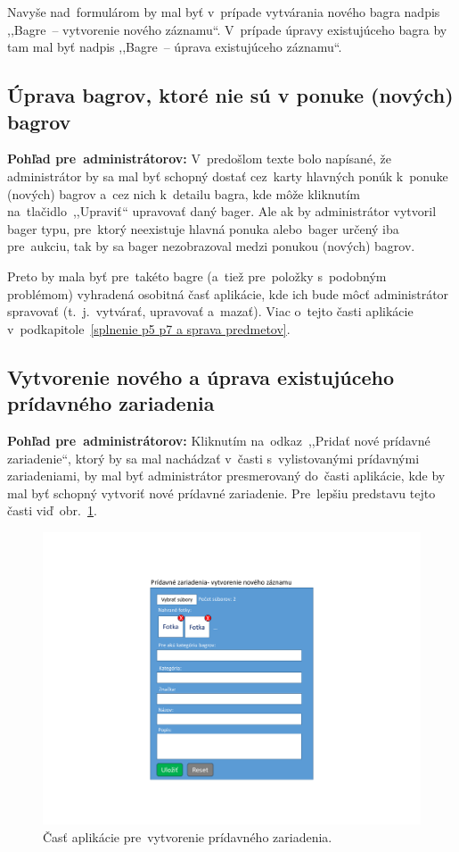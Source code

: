 Navyše nad~formulárom by mal byť v~prípade vytvárania nového bagra nadpis ,,Bagre~-- vytvorenie nového záznamu``. V~prípade úpravy existujúceho bagra by tam mal byť nadpis ,,Bagre~-- úprava existujúceho záznamu``.

\subsection{Úprava bagrov, ktoré nie sú v ponuke (nových) bagrov}

\textbf{Pohľad pre~administrátorov:} V~predošlom texte bolo napísané, že administrátor by sa mal byť schopný dostať cez~karty hlavných ponúk k~ponuke (nových) bagrov a~cez nich k~detailu bagra, kde môže kliknutím na~tlačidlo~,,Upraviť`` upravovať daný bager. Ale ak by administrátor vytvoril bager typu, pre~ktorý neexistuje hlavná ponuka alebo~bager určený iba pre~aukciu, tak by sa bager nezobrazoval medzi ponukou (nových) bagrov.

Preto by mala byť pre~takéto bagre (a~tiež pre~položky s~podobným problémom) vyhradená osobitná časť aplikácie, kde ich bude môcť administrátor spravovať (t.~j.~vytvárať, upravovať a~mazať). Viac o~tejto časti aplikácie v~podkapitole~\ref{splnenie p5 p7 a sprava predmetov}.
\newpage
\subsection{Vytvorenie nového a úprava existujúceho prídavného zariadenia}
\label{vytvorenie noveho a uprava existujuceho pridavného zariadenia}

\textbf{Pohľad pre~administrátorov:} Kliknutím na~odkaz~,,Pridať nové prídavné zariadenie``, ktorý by sa mal nachádzať v~časti s~vylistovanými prídavnými zariadeniami, by mal byť administrátor presmerovaný do~časti aplikácie, kde by mal byť schopný vytvoriť nové prídavné zariadenie. Pre~lepšiu predstavu tejto časti viď~obr.~\ref{additional equipment form}.

\begin{figure}[H]\centering
\includegraphics[width=140mm]{../img/UI concept/additional equipment form}
\caption{Časť aplikácie pre~vytvorenie prídavného zariadenia.}
\label{additional equipment form}
\end{figure}

